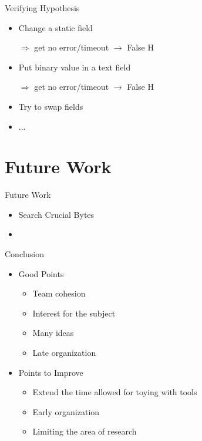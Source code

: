 \documentclass{beamer}
\newcounter{m} %
\newcounter{c} %
\begin{document}
  \begin{frame}{Verifying Hypothesis}
  \begin{itemize}
  \item Change a static field

  $\Rightarrow$ get no error/timeout $\rightarrow$ False H
  
  \bigskip

  \item Put binary value in a text field
  
  $\Rightarrow$ get no error/timeout $\rightarrow$ False H
  
  
\bigskip

  \item Try to swap fields
  
\bigskip

	\item ...  
  \end{itemize}
  \end{frame}


\section{Future Work}
\begin{frame}

	\tableofcontents[currentsection]
\end{frame}

\begin{frame}{Future Work}
\begin{itemize}
\item Search Crucial Bytes 
\item 
\end{itemize}

\end{frame}

\begin{frame}{Conclusion}
\begin{itemize}
\item Good Points
\begin{itemize}
\item Team cohesion 
\item Interest for the subject
\item Many ideas
\item Late organization
\end{itemize}

\item Points to Improve 
\begin{itemize}
\item Extend the time allowed for toying with tools
\item Early organization 
\item Limiting the area of research
\end{itemize}
\end{itemize}


\end{frame}
\end{document}
